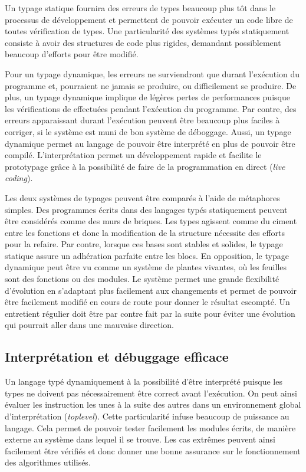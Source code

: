 \documentclass[12pt,oneside,letterpaper,francais]{book}
\begin{document}
Un typage statique fournira des erreurs de types beaucoup plus tôt
dans le processus de développement et permettent de pouvoir exécuter
un code libre de toutes vérification de types. Une particularité des
systèmes typés statiquement consiste à avoir des structures de code
plus rigides, demandant possiblement beaucoup d'efforts pour être
modifié. 

Pour un typage dynamique, les erreurs ne surviendront que durant
l'exécution du programme et, pourraient ne jamais se produire, ou
difficilement se produire. De plus, un typage dynamique implique de
légères pertes de performances puisque les vérifications de effectuées
pendant l'exécution du programme. Par contre, des erreurs apparaissant
durant l'exécution peuvent être beaucoup plus faciles à corriger, si
le système est muni de bon système de déboggage. Aussi, un typage
dynamique permet au langage de pouvoir être interprété en plus de
pouvoir être compilé. L'interprétation permet un développement rapide
et facilite le prototypage grâce à la possibilité de faire de la
programmation en direct (\textit{live coding}). 

Les deux systèmes de typages peuvent être comparés à l'aide de
métaphores simples. Des programmes écrits dans des langages typés
statiquement peuvent être considérés comme des murs de briques. Les
types agissent comme du ciment entre les fonctions et donc la
modification de la structure nécessite des efforts pour la
refaire. Par contre, lorsque ces bases sont stables et solides, le
typage statique assure un adhération parfaite entre les blocs.  En
opposition, le typage dynamique peut être vu comme un système de
plantes vivantes, où les feuilles sont des fonctions ou des
modules. Le système permet une grande flexibilité d'évolution en
s'adaptant plus facilement aux changements et permet de pouvoir être
facilement modifié en cours de route pour donner le résultat
escompté. Un entretient régulier doit être par contre fait par la
suite pour éviter une évolution qui pourrait aller dans une mauvaise
direction.


\subsection{Interprétation et débuggage efficace}

Un langage typé dynamiquement à la possibilité d'être interprété
puisque les types ne doivent pas nécessairement être correct avant
l'exécution. On peut ainsi évaluer les instruction les unes à la suite
des autres dans un environnement global d'interprétation
(\textit{toplevel}). Cette particularité infuse beaucoup de puissance
au langage. Cela permet de pouvoir tester facilement les modules
écrits, de manière externe au système dans lequel il se trouve. Les
cas extrêmes peuvent ainsi facilement être vérifiés et donc donner une
bonne assurance sur le fonctionnement des algorithmes utilisés.
\end{document}
